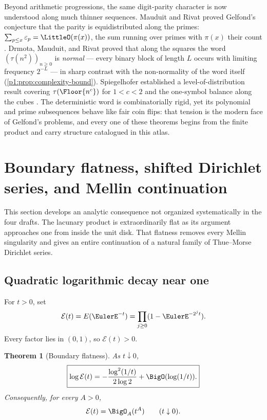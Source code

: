 \documentclass[11pt,oneside]{article}
\numberwithin{equation}{section}
\newtheorem{theorem}{Theorem}[section]
\theoremstyle{definition}
\theoremstyle{remark}
\newcommand{\eps}{\varepsilon}
\begin{document}
Beyond arithmetic progressions, the same digit-parity character is now
understood along much thinner sequences.  Mauduit and Rivat proved
Gelfond's conjecture that the parity is equidistributed along the primes:
\(\sum_{p\le x}\eps_p=\LittleO(\pi(x))\), the sum running over primes with
\(\pi(x)\) their count \cite{p1:mauduitRivat2010}.  Drmota, Mauduit, and Rivat
proved that along the squares the word
\((\tau(n^2))_{n\ge0}\) is \emph{normal} --- every binary block of length
\(L\) occurs with limiting frequency \(2^{-L}\)
\cite{p1:drmotaMauduitRivat2019} --- in sharp contrast with the non-normality
of the word itself (\cref{p1:prop:complexity-bound}).  Spiegelhofer
established a level-of-distribution result covering
\(\tau(\Floor{n^c})\) for \(1<c<2\) \cite{p1:spiegelhofer2020} and the
one-symbol balance along the cubes \cite{p1:spiegelhofer2023}.  The
deterministic word is combinatorially rigid, yet its polynomial and prime
subsequences behave like fair coin flips: that tension is the modern face
of Gelfond's problems, and every one of these theorems begins from the
finite product and carry structure catalogued in this atlas.

\section[Mellin--Dirichlet continuation]{Boundary flatness, shifted Dirichlet series, and Mellin continuation}
\label{p1:sec:dirichlet-mellin}

This section develops an analytic consequence not organized systematically in
the four drafts.  The lacunary product is extraordinarily flat as its argument
approaches one from inside the unit disk.  That flatness removes every Mellin
singularity and gives an entire continuation of a natural family of
Thue--Morse Dirichlet series.

\subsection{Quadratic logarithmic decay near one}

For \(t>0\), set
\begin{equation}
  \mathcal E(t)=E(\EulerE^{-t})
  =\prod_{j\ge0}(1-\EulerE^{-2^jt}).
  \label{p1:eq:E-caligraphic}
\end{equation}
Every factor lies in \((0,1)\), so \(\mathcal E(t)>0\).

\begin{theorem}[Boundary flatness]
\label{p1:thm:boundary-flatness}
As \(t\downarrow0\),
\begin{equation}
  \boxed{
  \log\mathcal E(t)
  =-\frac{\log^2(1/t)}{2\log2}
   +\BigO(\log(1/t)).}
  \label{p1:eq:boundary-log-asymptotic}
\end{equation}
Consequently, for every \(A>0\),
\begin{equation}
  \mathcal E(t)=\BigO_A(t^A)
  \qquad(t\downarrow0).
  \label{p1:eq:superpolynomial-flatness}
\end{equation}
\end{theorem}
\end{document}
